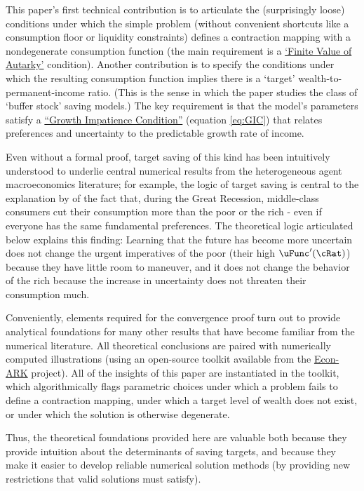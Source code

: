 \documentclass[./BufferStockTheory.tex]{subfiles}
\begin{document}
This paper's first technical contribution is to articulate the (surprisingly loose) conditions under which the simple problem (without convenient shortcuts like a consumption floor or liquidity constraints) defines a contraction mapping with a nondegenerate consumption function (the main requirement is a \hyperlink{FVAC}{`Finite Value of Autarky'} condition).  Another contribution is to specify the conditions under which the resulting consumption function implies there is a `target' wealth-to-permanent-income ratio.  (This is the sense in which the paper studies the class of `buffer stock' saving models.)  The key requirement is that the model's parameters satisfy a \hyperlink{GIC}{``Growth Impatience Condition''} (equation \eqref{eq:GIC}) that relates preferences and uncertainty to the predictable growth rate of income.

\hypertarget{KMP}{}

Even without a formal proof, target saving of this kind has been intuitively understood to underlie central numerical results from the heterogeneous agent macroeconomics literature; for example, the logic of target saving is central to the explanation by \cite{kmpHandbook} of the fact that, during the Great Recession, middle-class consumers cut their consumption more than the poor or the rich - even if everyone has the same fundamental preferences.  The theoretical logic articulated below explains this finding:  Learning that the future has become more uncertain does not change the urgent imperatives of the poor (their high $\uFunc^{\prime}(\cRat)$) because they have little room to maneuver, and it does not change the behavior of the rich because the increase in uncertainty does not threaten their consumption much.  

Conveniently, elements required for the convergence proof turn out to provide analytical foundations for many other results that have become familiar from the numerical literature.  All theoretical conclusions are paired with numerically computed illustrations (using an open-source toolkit available from the \href{https://github.com/econ-ark/REMARK/blob/master/REMARKs/BufferStockTheory/BufferStockTheory.ipynb}{Econ-ARK} project).  All of the insights of this paper are instantiated in the toolkit, which algorithmically flags parametric choices under which a problem fails to define a contraction mapping, under which a target level of wealth does not exist, or under which the solution is otherwise degenerate.

Thus, the theoretical foundations provided here are valuable both because they provide intuition about the determinants of saving targets, and because they make it easier to develop reliable numerical solution methods (by providing new restrictions that valid solutions must satisfy).
\end{document}
